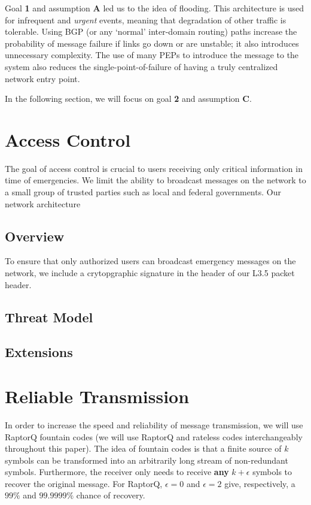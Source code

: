 Goal \textbf{1} and assumption \textbf{A} led us to the idea of flooding. This architecture is used for infrequent and \textit{urgent} events, meaning that degradation of other traffic is tolerable. Using BGP (or any `normal' inter-domain routing) paths increase the probability of message failure if links go down or are unstable; it also introduces unnecessary complexity. The use of many PEPs to introduce the message to the system also reduces the single-point-of-failure of having a truly centralized network entry point.

In the following section, we will focus on goal \textbf{2} and assumption \textbf{C}. 
\section{Access Control}\label{acl}
The goal of access control is crucial to users receiving only critical information in time of emergencies. We limit the ability to broadcast messages on the network to a small group of trusted parties such as local and federal governments. Our network architecture 
\subsection{Overview}
To ensure that only authorized users can broadcast emergency messages on the network, we include a crytopgraphic signature in the header of our L3.5 packet header. 
\subsection{Threat Model}
\subsection{Extensions}


\section{Reliable Transmission}\label{reliable}
In order to increase the speed and reliability of message transmission, we will use RaptorQ fountain codes (we will use RaptorQ and rateless codes interchangeably throughout this paper). The idea of fountain codes is that a finite source of $k$ symbols can be transformed into an arbitrarily long stream of non-redundant symbols. Furthermore, the receiver only needs to receive \textbf{any} $k + \epsilon$ symbols to recover the original message. For RaptorQ, $\epsilon = 0$ and $\epsilon = 2$ give, respectively, a $99\%$ and $99.9999\%$ chance of recovery.\cite{raptorq, raptorqpresent}

